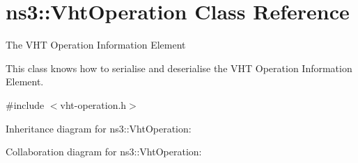 \hypertarget{classns3_1_1VhtOperation}{}\section{ns3\+:\+:Vht\+Operation Class Reference}
\label{classns3_1_1VhtOperation}


The V\+HT Operation Information Element

This class knows how to serialise and deserialise the V\+HT Operation Information Element.  




{\ttfamily \#include $<$vht-\/operation.\+h$>$}



Inheritance diagram for ns3\+:\+:Vht\+Operation\+:


Collaboration diagram for ns3\+:\+:Vht\+Operation\+:
